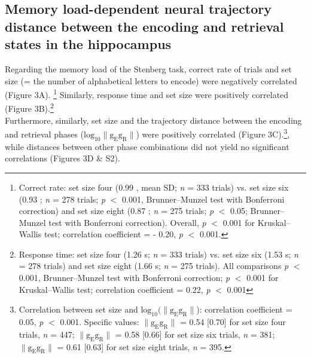 \documentclass[final,3p,times,twocolumn]{elsarticle}
\begin{document}
\subsection{Memory load-dependent neural trajectory distance between the encoding and retrieval states in the hippocampus}
Regarding the memory load of the Stenberg task, correct rate of trials and set size (= the number of alphabetical letters to encode) were negatively correlated (Figure 3A). \footnote{Correct rate: set size four (0.99 , mean \textpm SD; \textit{n} = 333 trials) vs. set size six (0.93 ; \textit{n} = 278 trials; \textit{p} $<$ 0.001, Brunner--Munzel test with Bonferroni correction) and set size eight (0.87 ; \textit{n} = 275 trials; \textit{p} $<$ 0.05; Brunner--Munzel test with Bonferroni correction). Overall, \textit{p} $<$ 0.001 for Kruskal--Wallis test; correlation coefficient = - 0.20, \textit{p} $<$ 0.001.} Similarly, response time and set size were positively correlated (Figure 3B).\footnote{Response time: set size four (1.26  s; \textit{n} = 333 trials) vs. set size six (1.53  s; \textit{n} = 278 trials) and set size eight (1.66  s; \textit{n} = 275 trials). All comparisons \textit{p} $<$ 0.001, Brunner--Munzel test with Bonferroni correction; \textit{p} $<$ 0.001 for Kruskal--Wallis test; correlation coefficient = 0.22, \textit{p} $<$ 0.001}
\\
\indent
Furthermore, similarly, set size and the trajectory distance between the encoding and retrieval phases ($\mathrm{log_{10}\lVert g_{E}g_{R} \rVert}$) were positively correlated (Figure 3C).\footnote{Correlation between set size and $\mathrm{log_{10}(\lVert g_{E}g_{R} \rVert}$): correlation coefficient = 0.05, \textit{p} $<$ 0.001. Specific values: $\mathrm{\lVert g_{E}g_{R} \rVert}$ = 0.54 [0.70] for set size four trials, \textit{n} = 447; $\mathrm{\lVert g_{E}g_{R} \rVert}$ = 0.58 [0.66] for set size six trials, \textit{n} = 381; $\mathrm{\lVert g_{E}g_{R} \rVert}$ = 0.61 [0.63] for set size eight trials, \textit{n} = 395.}, while distances between other phase combinations did not yield no significant correlations (Figures 3D \& S2).
\end{document}
